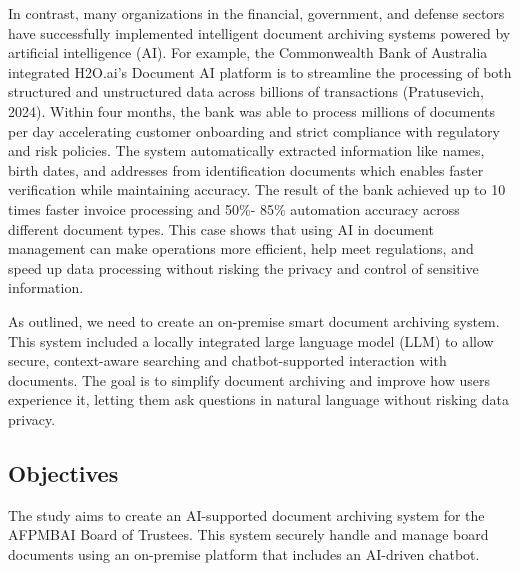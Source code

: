In contrast, many organizations in the financial, government, and defense sectors have successfully implemented intelligent document archiving systems powered by artificial intelligence (AI). For example, the Commonwealth Bank of Australia integrated H2O.ai’s Document AI platform is to streamline the processing of both structured and unstructured data across billions of transactions (Pratusevich, 2024). Within four months, the bank was able to process millions of documents per day accelerating customer onboarding and strict compliance with regulatory and risk policies. The system automatically extracted information like names, birth dates, and addresses from identification documents which enables faster verification while maintaining accuracy. The result of the bank achieved up to 10 times faster invoice processing and 50\%- 85\% automation accuracy across different document types. This case shows that using AI in document management can make operations more efficient, help meet regulations, and speed up data processing without risking the privacy and control of sensitive information.

As outlined, we need to create an on-premise smart document archiving system. This system included a locally integrated large language model (LLM) to allow secure, context-aware searching and chatbot-supported interaction with documents. The goal is to simplify document archiving and improve how users experience it, letting them ask questions in natural language without risking data privacy.


    \subsection{Objectives}
        The study aims to create an AI-supported document archiving system for the AFPMBAI Board of Trustees. This system securely handle and manage board documents using an on-premise platform that includes an AI-driven chatbot.

